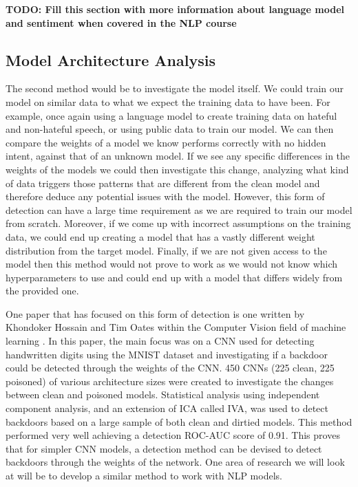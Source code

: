 \textbf{TODO: Fill this section with more information about language model and sentiment when covered in the NLP course}

\subsection{Model Architecture Analysis}

The second method would be to investigate the model itself. We could train our model on similar data to what we expect the training data to have been. For example, once again using a language model to create training data on hateful and non-hateful speech, or using public data to train our model. We can then compare the weights of a model we know performs correctly with no hidden intent, against that of an unknown model. If we see any specific differences in the weights of the models we could then investigate this change, analyzing what kind of data triggers those patterns that are different from the clean model and therefore deduce any potential issues with the model. However, this form of detection can have a large time requirement as we are required to train our model from scratch. Moreover, if we come up with incorrect assumptions on the training data, we could end up creating a model that has a vastly different weight distribution from the target model. Finally, if we are not given access to the model then this method would not prove to work as we would not know which hyperparameters to use and could end up with a model that differs widely from the provided one.

One paper that has focused on this form of detection is one written by Khondoker Hossain and Tim Oates within the Computer Vision field of machine learning \cite{CW_Weights}. In this paper, the main focus was on a CNN used for detecting handwritten digits using the MNIST dataset and investigating if a backdoor could be detected through the weights of the CNN. 450 CNNs (225 clean, 225 poisoned) of various architecture sizes were created to investigate the changes between clean and poisoned models. Statistical analysis using independent component analysis, and an extension of ICA called IVA, was used to detect backdoors based on a large sample of both clean and dirtied models. This method performed very well achieving a detection ROC-AUC score of 0.91. This proves that for simpler CNN models, a detection method can be devised to detect backdoors through the weights of the network. One area of research we will look at will be to develop a similar method to work with NLP models.

